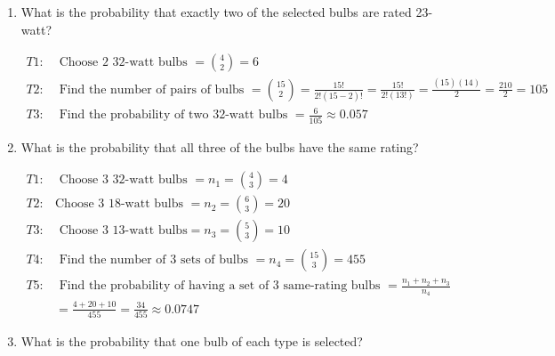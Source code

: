     \begin{enumerate}[label=(\alph*)]
        \item What is the probability that exactly two of the selected bulbs are rated 23-watt?
        
        \begin{mdframed}
            \begin{align*}
                T1: & \text{ Choose 2 32-watt bulbs } = {4 \choose 2} = 6   \\
                T2: & \text{ Find the number of pairs of bulbs } = {15 \choose 2} = \frac{15!}{2!(15-2)!} = \frac{15!}{2!(13!)} = \frac{(15)(14)}{2} = \frac{210}{2} = 105    \\
                T3: & \text{ Find the probability of two 32-watt bulbs } = \frac{6}{105} \approx \boxed{0.057}
            \end{align*}
        \end{mdframed}

        \item What is the probability that all three of the bulbs have the same rating?
        
        \begin{mdframed}
            \begin{align*}
                    T1: & \text{ Choose 3 32-watt bulbs } = n_1 = {4 \choose 3} = 4   \\
                    T2: & \text{Choose 3 18-watt bulbs } = n_2 = {6 \choose 3} = 20   \\
                    T3: & \text{ Choose 3 13-watt bulbs}  = n_3 = {5 \choose 3} = 10   \\
                    T4: & \text{ Find the number of 3 sets of bulbs } = n_4 = {15 \choose 3} = 455 \\
                    T5: & \text{ Find the probability of having a set of 3 same-rating bulbs } = \frac{n_1 + n_2 + n_3}{n_4}    \\
                    & = \frac{4 + 20 + 10}{455} = \frac{34}{455} \approx \boxed{0.0747}
            \end{align*}
        \end{mdframed}

        \item What is the probability that one bulb of each type is selected?
        

\end{enumerate}

